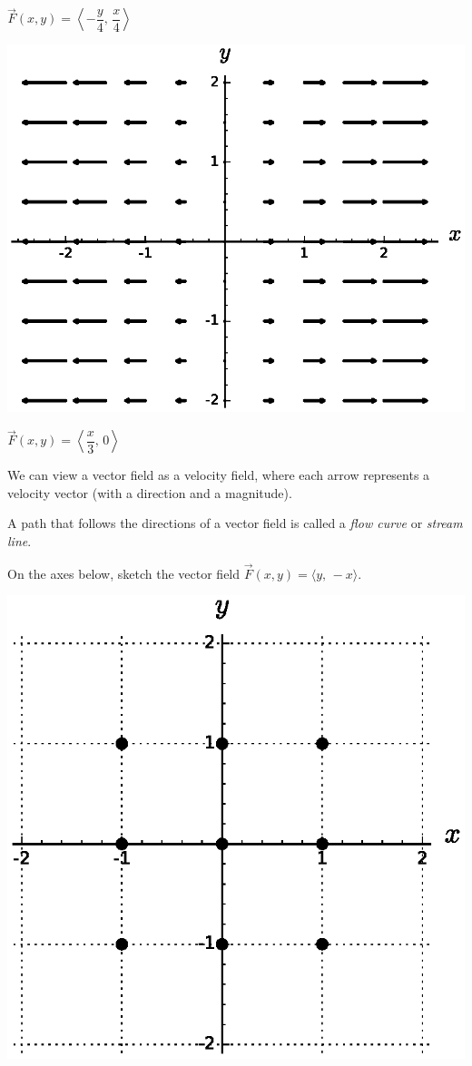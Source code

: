\begin{example}
\begin{minipage}{.4\textwidth}
\begin{center}
            $\vec{F}(x,y) = \left\langle -\dfrac{y}{4}, \, \dfrac{x}{4}\right\rangle$ 
        \end{center}
    \end{minipage}
    \hfill 
    \begin{minipage}{.4\textwidth}
        \begin{center}
            \includegraphics[width=.9\textwidth]{images/vf2.eps} \medskip
            
            $\vec{F}(x,y) = \left\langle \dfrac{x}{3}, \, 0\right\rangle$ 
        \end{center}
    \end{minipage}
\end{example}

We can view a vector field as a velocity field, where each arrow represents a velocity vector (with a direction and a magnitude).

\begin{defn}
    A path that follows the directions of a vector field is called a \emph{flow curve} or \emph{stream line}.
\end{defn}

\begin{ex}
    On the axes below, sketch the vector field  $\vec{F}(x,y)=\langle y,\,  -x \rangle$.
    
    \includegraphics[width=.5\textwidth]{images/dots_fewer}
\end{ex}

